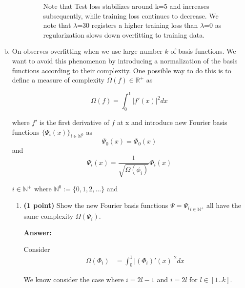\documentclass{./tufte-handout}
\begin{document}
\begin{enumerate}[(a)]
\begin{enumerate}
\begin{figure}
    \caption{Note that Test loss stabilizes around k=5 
    and increases subsequently, while training loss continues to decrease. 
    We note that $\lambda$=30 registers a higher training  loss than $\lambda$=0 as 
    regularization slows down overfitting to training data.}
   \end{figure}
   \FloatBarrier
\end{enumerate}
\FloatBarrier

\item On observes overfitting when we use large number $k$ of basis functions. We 
want to avoid this phenomenon by introducing a normalization of the basis functions according 
to their complexity. One possible way to do this is to define a measure of complexity $\Omega(f) \in \mathbb{R}^+$ as

\begin{equation}
    \Omega(f) = \int_0^1 |f'(x)|^2  dx
\end{equation}

where $f'$ is the first derivative of $f$ at x and introduce new Fourier basis functions $\{\Psi_i(x)\}_{i \in \mathbb{N}^0}$ as
\begin{equation}
    \Psi_0(x) = \Phi_0(x) 
\end{equation} 
and 
\begin{equation}
    \Psi_i(x) = \frac{1}{\sqrt{\Omega(\phi_i)}} \Phi_i(x) 
\end{equation}

$i \in \mathbb{N}^+$ where $\mathbb{N}^0 :=\{0, 1,2, \dots \}$ and 
\begin{enumerate}
    \item \textbf{(1 point)} Show the new Fourier basis functions $\Psi = {\Psi_i}_{ i\in \mathbb{N}^+}$ all have the same 
    complexity $\Omega(\Psi_i)$. 

    \textbf{Answer:}

    Consider 
    \begin{align} 
        \Omega(\Phi_i) &= \int_0^1 |(\Phi_i)'(x)|^2 dx
    \end{align}

    We know consider the case where $i=2l-1$ and $i=2l$ for $l \in [1..k]$. 


\end{enumerate}
\end{enumerate}
\end{document}
